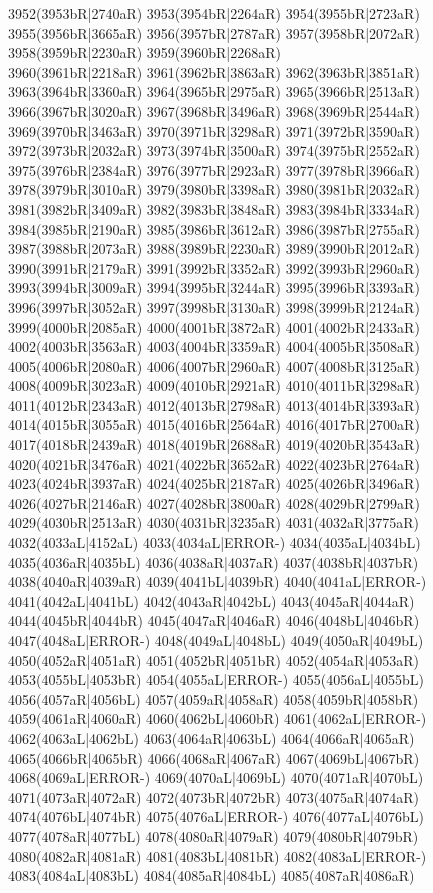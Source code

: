 3952(3953bR|2740aR) 3953(3954bR|2264aR) 3954(3955bR|2723aR) 3955(3956bR|3665aR) 3956(3957bR|2787aR) 3957(3958bR|2072aR) 3958(3959bR|2230aR) 3959(3960bR|2268aR) \\3960(3961bR|2218aR) 3961(3962bR|3863aR) 3962(3963bR|3851aR) 3963(3964bR|3360aR) 3964(3965bR|2975aR) 3965(3966bR|2513aR) 3966(3967bR|3020aR) 3967(3968bR|3496aR) 3968(3969bR|2544aR) \\3969(3970bR|3463aR) 3970(3971bR|3298aR) 3971(3972bR|3590aR) 3972(3973bR|2032aR) 3973(3974bR|3500aR) 3974(3975bR|2552aR) 3975(3976bR|2384aR) 3976(3977bR|2923aR) 3977(3978bR|3966aR) \\3978(3979bR|3010aR) 3979(3980bR|3398aR) 3980(3981bR|2032aR) 3981(3982bR|3409aR) 3982(3983bR|3848aR) 3983(3984bR|3334aR) 3984(3985bR|2190aR) 3985(3986bR|3612aR) 3986(3987bR|2755aR) \\3987(3988bR|2073aR) 3988(3989bR|2230aR) 3989(3990bR|2012aR) 3990(3991bR|2179aR) 3991(3992bR|3352aR) 3992(3993bR|2960aR) 3993(3994bR|3009aR) 3994(3995bR|3244aR) 3995(3996bR|3393aR) \\3996(3997bR|3052aR) 3997(3998bR|3130aR) 3998(3999bR|2124aR) 3999(4000bR|2085aR) 4000(4001bR|3872aR) 4001(4002bR|2433aR) 4002(4003bR|3563aR) 4003(4004bR|3359aR) 4004(4005bR|3508aR) \\4005(4006bR|2080aR) 4006(4007bR|2960aR) 4007(4008bR|3125aR) 4008(4009bR|3023aR) 4009(4010bR|2921aR) 4010(4011bR|3298aR) 4011(4012bR|2343aR) 4012(4013bR|2798aR) 4013(4014bR|3393aR) \\4014(4015bR|3055aR) 4015(4016bR|2564aR) 4016(4017bR|2700aR) 4017(4018bR|2439aR) 4018(4019bR|2688aR) 4019(4020bR|3543aR) 4020(4021bR|3476aR) 4021(4022bR|3652aR) 4022(4023bR|2764aR) \\4023(4024bR|3937aR) 4024(4025bR|2187aR) 4025(4026bR|3496aR) 4026(4027bR|2146aR) 4027(4028bR|3800aR) 4028(4029bR|2799aR) 4029(4030bR|2513aR) 4030(4031bR|3235aR) 4031(4032aR|3775aR) \\4032(4033aL|4152aL) 4033(4034aL|ERROR-) 4034(4035aL|4034bL) 4035(4036aR|4035bL) 4036(4038aR|4037aR) 4037(4038bR|4037bR) 4038(4040aR|4039aR) 4039(4041bL|4039bR) 4040(4041aL|ERROR-) \\4041(4042aL|4041bL) 4042(4043aR|4042bL) 4043(4045aR|4044aR) 4044(4045bR|4044bR) 4045(4047aR|4046aR) 4046(4048bL|4046bR) 4047(4048aL|ERROR-) 4048(4049aL|4048bL) 4049(4050aR|4049bL) \\4050(4052aR|4051aR) 4051(4052bR|4051bR) 4052(4054aR|4053aR) 4053(4055bL|4053bR) 4054(4055aL|ERROR-) 4055(4056aL|4055bL) 4056(4057aR|4056bL) 4057(4059aR|4058aR) 4058(4059bR|4058bR) \\4059(4061aR|4060aR) 4060(4062bL|4060bR) 4061(4062aL|ERROR-) 4062(4063aL|4062bL) 4063(4064aR|4063bL) 4064(4066aR|4065aR) 4065(4066bR|4065bR) 4066(4068aR|4067aR) 4067(4069bL|4067bR) \\4068(4069aL|ERROR-) 4069(4070aL|4069bL) 4070(4071aR|4070bL) 4071(4073aR|4072aR) 4072(4073bR|4072bR) 4073(4075aR|4074aR) 4074(4076bL|4074bR) 4075(4076aL|ERROR-) 4076(4077aL|4076bL) \\4077(4078aR|4077bL) 4078(4080aR|4079aR) 4079(4080bR|4079bR) 4080(4082aR|4081aR) 4081(4083bL|4081bR) 4082(4083aL|ERROR-) 4083(4084aL|4083bL) 4084(4085aR|4084bL) 4085(4087aR|4086aR) 
